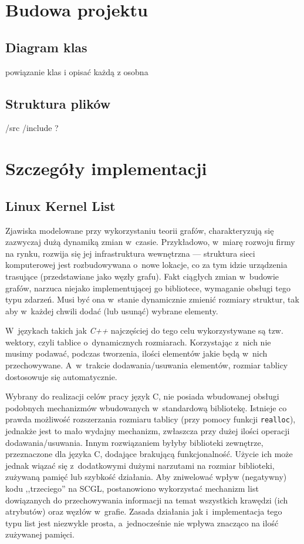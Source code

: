 \documentclass[a4paper,12pt,polish,oneside]{thesis}
\newcommand\code[1]{\lstinline[style=line]{#1}}
\begin{document}
\section{Budowa projektu}
\subsection{Diagram klas}
powiązanie klas i opisać każdą z osobna
\subsection{Struktura plików}
/src /include ?
\section{Szczegóły implementacji}

\subsection{Linux Kernel List}

Zjawiska modelowane przy wykorzystaniu teorii grafów, charakteryzują się zazwyczaj dużą dynamiką zmian w~czasie.
Przykładowo, w~miarę rozwoju firmy na rynku, rozwija się jej infrastruktura wewnętrzna --- struktura sieci komputerowej jest rozbudowywana o~nowe lokacje, co za tym idzie urządzenia trasujące (przedstawiane jako węzły grafu).
Fakt ciągłych zmian w~budowie grafów, narzuca niejako implementującej go bibliotece, wymaganie obsługi tego typu zdarzeń.
Musi być ona w~stanie dynamicznie zmienić rozmiary struktur, tak aby w~każdej chwili dodać (lub usunąć) wybrane elementy.

W~językach takich jak \emph{C++} najczęściej do tego celu wykorzystywane są tzw. wektory, czyli tablice o~dynamicznych rozmiarach.
Korzystając z~nich nie musimy podawać, podczas tworzenia, ilości elementów jakie będą w~nich przechowywane.
A~w~trakcie dodawania/usuwania elementów, rozmiar tablicy dostosowuje się automatycznie.

Wybrany do realizacji celów pracy język C, nie posiada wbudowanej obsługi podobnych mechanizmów wbudowanych w~standardową bibliotekę.
Istnieje co prawda możliwość rozszerzania rozmiaru tablicy (przy pomocy funkcji \code{realloc}), jednakże jest to mało wydajny mechanizm, zwłaszcza przy dużej ilości operacji dodawania/usuwania.
Innym rozwiązaniem byłyby biblioteki zewnętrze, przeznaczone dla języka C, dodające brakującą funkcjonalność.
Użycie ich może jednak wiązać się z~dodatkowymi dużymi narzutami na rozmiar biblioteki, zużywaną pamięć lub szybkość działania.
Aby zniwelować wpływ (negatywny) kodu ,,trzeciego'' na SCGL, postanowiono wykorzystać mechanizm list dowiązanych do przechowywania informacji na temat wszystkich krawędzi (ich atrybutów) oraz węzłów w~grafie.
Zasada działania jak i~implementacja tego typu list jest niezwykle prosta, a~jednocześnie nie wpływa znacząco na ilość zużywanej pamięci.
\end{document}
